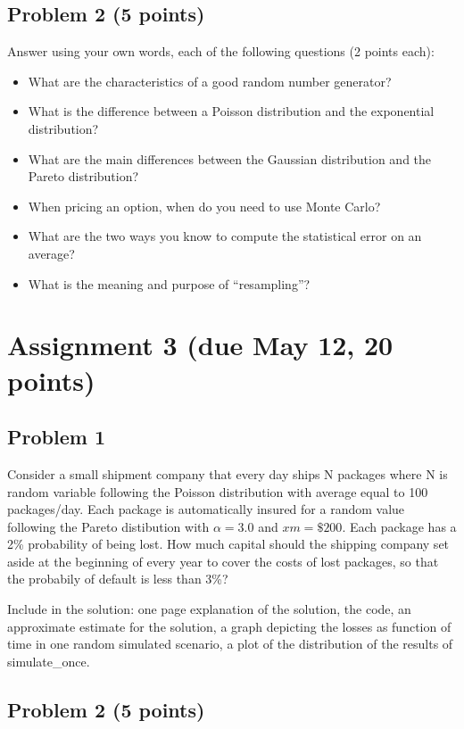 \documentclass[12pt]{article}
\begin{document}
\subsection{Problem 2 (5 points)}

Answer using your own words, each of the following questions (2 points each):

\begin{itemize}
\item What are the characteristics of a good random number generator?
\item What is the difference between a Poisson distribution and the exponential distribution?
\item What are the main differences between the Gaussian distribution and the Pareto distribution?
\item When pricing an option, when do you need to use Monte Carlo?
\item What are the two ways you know to compute the statistical error on an average?
\item What is the meaning and purpose of ``resampling''?
\end{itemize}

\section{Assignment 3 (due May 12, 20 points)}

\subsection{Problem 1}

Consider a small shipment company that every day ships N packages where N is random variable following the Poisson distribution with average equal to 100 packages/day. Each package is automatically insured for a random value following the Pareto distibution with $\alpha=3.0$ and $xm = \$200$. Each package has a 2\% probability of being lost. How much capital should the shipping company set aside at the beginning of every year to cover the costs of lost packages, so that the probabily of default is less than 3\%?

Include in the solution: one page explanation of the solution, the code, an approximate estimate for the solution, a graph depicting the losses as function of time in one random simulated scenario, a plot of the distribution of the results of simulate\_once.

\subsection{Problem 2 (5 points)}
\end{document}
